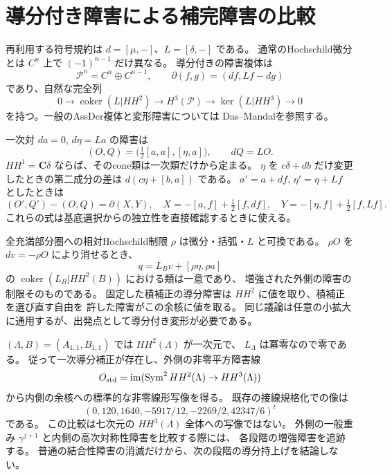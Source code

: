 \section{導分付き障害による補完障害の比較}
\label{sec:notes-obstruction-transgression-v40}

再利用する符号規約は $d=[\mu,-]$、$L=[\delta,-]$ である。
通常のHochschild微分とは $C^n$ 上で $(-1)^{n-1}$ だけ異なる。
導分付きの障害複体は
\[
 \mathcal P^n=C^n\oplus C^{n-1},\qquad
 \partial(f,g)=(df,Lf-dg)
\]
であり、自然な完全列
\[
 0\to\operatorname{coker}(L|HH^2)\to H^3(\mathcal P)
   \to\ker(L|HH^3)\to0
\]
を持つ。一般のAssDer複体と変形障害については
Das--Mandal\cite{DasMandal2026}を参照する。

一次対 $da=0$, $d\eta=La$ の障害は
\[
 (O,Q)=\bigl(\tfrac12[a,a],[\eta,a]\bigr),\qquad dQ=LO.
\]
$HH^1=\mathbf C\delta$ ならば、そのcone類は一次類だけから定まる。
$\eta$ を $c\delta+db$ だけ変更したときの第二成分の差は
$d(c\eta+[b,a])$ である。
$a'=a+df$, $\eta'=\eta+Lf$ としたときは
\[
 (O',Q')-(O,Q)=\partial(X,Y),\quad
 X=-[a,f]+\tfrac12[f,df],\quad
 Y=-[\eta,f]+\tfrac12[f,Lf].
\]
これらの式は基底選択からの独立性を直接確認するときに使える。

全充満部分圏への相対Hochschild制限 $\rho$ は微分・括弧・$L$ と可換である。
$\rho O$ を $dv=-\rho O$ により消せるとき、
\[
 q=L_Bv+[\rho\eta,\rho a]
\]
の $\operatorname{coker}(L_B|HH^2(B))$ における類は一意であり、
増強された外側の障害の制限そのものである。
固定した積補正の導分障害は $HH^2$ に値を取り、積補正を選び直す自由を
許した障害がこの余核に値を取る。
同じ議論は任意の小拡大に通用するが、出発点として導分付き変形が必要である。

$(\Lambda,B)=(A_{1,1},B_{1,1})$ では $HH^2(\Lambda)$ が一次元で、
$L_\Lambda$ は冪零なので零である。
従って一次導分補正が存在し、外側の非零平方障害線
\[
 O_{\rm std}=\operatorname{im}(\operatorname{Sym}^2HH^2(\Lambda)\to HH^3(\Lambda))
\]
から内側の余核への標準的な非零線形写像を得る。
既存の接線規格化での像は
\[
 (0,120,1640,-5917/12,-2269/2,42347/6)^t
\]
である。
この比較は七次元の $HH^3(\Lambda)$ 全体への写像ではない。
外側の一般重み $\gamma^{j+1}$ と内側の高次対称性障害を比較する際には、
各段階の増強障害を追跡する。
普通の結合性障害の消滅だけから、次の段階の導分持上げを結論しない。
